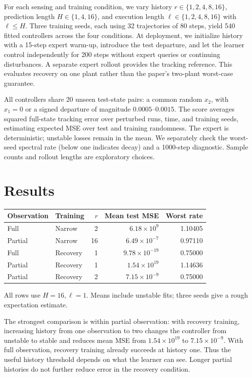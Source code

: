 \documentclass{l4dc2026}
\begin{document}
For each sensing and training condition, we vary history $r\in\{1,2,4,8,16\}$, prediction length $H\in\{1,4,16\}$, and execution length $\ell\in\{1,2,4,8,16\}$ with $\ell\le H$. Three training seeds, each using 32 trajectories of 80 steps, yield 540 fitted controllers across the four conditions. At deployment, we initialize history with a 15-step expert warm-up, introduce the test departure, and let the learner control independently for 200 steps without expert queries or continuing disturbances. A separate expert rollout provides the tracking reference. This evaluates recovery on one plant rather than the paper's two-plant worst-case guarantee.

All controllers share 20 unseen test-state pairs: a common random $x_2$, with $x_1=0$ or a signed departure of magnitude $0.0005$--$0.0015$. The score averages squared full-state tracking error over perturbed runs, time, and training seeds, estimating expected MSE over test and training randomness. The expert is deterministic; unstable losses remain in the mean. We separately check the worst-seed spectral rate (below one indicates decay) and a 1000-step diagnostic. Sample counts and rollout lengths are exploratory choices.

\section{Results}
\begin{center}\small
\begin{tabular}{llrrr}\toprule
Observation & Training & $r$ & Mean test MSE & Worst rate\\\midrule
Full & Narrow & 2 & $6.18\times10^9$ & 1.10405\\
Partial & Narrow & 16 & $6.49\times10^{-7}$ & 0.97110\\
Full & Recovery & 1 & $9.78\times10^{-19}$ & 0.75000\\
Partial & Recovery & 1 & $1.54\times10^{19}$ & 1.14636\\
Partial & Recovery & 2 & $7.15\times10^{-9}$ & 0.75000\\\bottomrule
\end{tabular}
\end{center}
All rows use $H=16,\ell=1$. Means include unstable fits; three seeds give a rough expectation estimate.

The strongest comparison is within partial observation: with recovery training, increasing history from one observation to two changes the controller from unstable to stable and reduces mean MSE from $1.54\times10^{19}$ to $7.15\times10^{-9}$. With full observation, recovery training already succeeds at history one. Thus the useful history threshold depends on what the learner can see. Longer partial histories do not further reduce error in the recovery condition.
\end{document}

